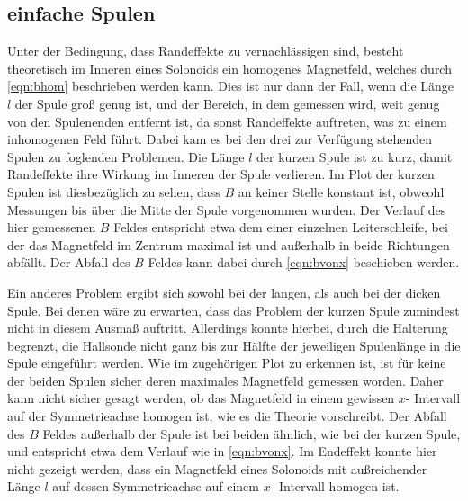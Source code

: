     \subsection{einfache Spulen}
        Unter der Bedingung, dass Randeffekte zu vernachlässigen sind, besteht theoretisch im Inneren eines Solonoids ein
        homogenes Magnetfeld, welches durch \eqref{eqn:bhom} beschrieben werden kann. Dies ist nur dann der Fall, wenn die Länge $l$
        der Spule groß genug ist, und der Bereich, in dem gemessen wird, weit genug von den Spulenenden entfernt ist, da sonst
        Randeffekte auftreten, was zu einem inhomogenen Feld führt. Dabei kam es bei den drei zur Verfügung stehenden Spulen zu
        foglenden Problemen. Die Länge $l$ der kurzen Spule ist zu kurz, damit Randeffekte ihre Wirkung im Inneren der Spule verlieren.
        Im Plot der kurzen Spulen ist diesbezüglich zu sehen, dass $B$ an keiner Stelle konstant ist, obweohl Messungen bis über die
        Mitte der Spule vorgenommen wurden. Der Verlauf des hier gemessenen $B$ Feldes entspricht etwa dem einer einzelnen Leiterschleife,
        bei der das Magnetfeld im Zentrum maximal ist und außerhalb in beide Richtungen abfällt. Der Abfall des $B$ Feldes kann dabei
        durch \eqref{eqn:bvonx} beschieben werden. 

        Ein anderes Problem ergibt sich sowohl bei der langen, als auch bei der dicken Spule. Bei denen wäre zu erwarten, dass 
        das Problem der kurzen Spule zumindest nicht in diesem Ausmaß auftritt. Allerdings konnte hierbei, durch die Halterung begrenzt,
        die Hallsonde nicht ganz bis zur Hälfte der jeweiligen Spulenlänge in die Spule eingeführt werden. Wie im zugehörigen Plot
        zu erkennen ist, ist für keine der beiden Spulen sicher deren maximales Magnetfeld gemessen worden. Daher kann nicht sicher 
        gesagt werden, ob das Magnetfeld in einem gewissen $x$- Intervall auf der Symmetrieachse homogen ist, wie es die Theorie vorschreibt.
        Der Abfall des $B$ Feldes außerhalb der Spule ist bei beiden ähnlich, wie bei der kurzen Spule, und entspricht etwa dem Verlauf
        wie in \eqref{eqn:bvonx}. 
        Im Endeffekt konnte hier nicht gezeigt werden, dass ein Magnetfeld eines Solonoids mit außreichender Länge $l$ auf dessen
        Symmetrieachse auf einem $x$- Intervall homogen ist. 

